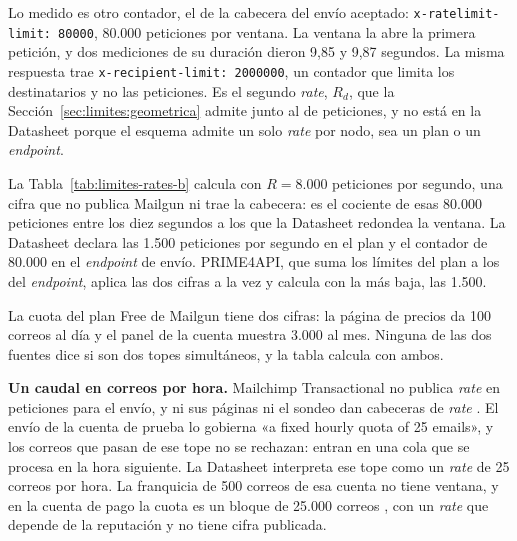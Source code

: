 Lo medido es otro contador, el de la cabecera del envío aceptado: \texttt{x-ratelimit-limit: 80000}, 80.000 peticiones por ventana.
La ventana la abre la primera petición, y dos mediciones de su duración dieron 9,85 y 9,87 segundos.
La misma respuesta trae \texttt{x-recipient-limit: 2000000}, un contador que limita los destinatarios y no las peticiones.
Es el segundo \textit{rate}, $R_d$, que la Sección~\ref{sec:limites:geometrica} admite junto al de peticiones, y no está en la Datasheet porque el esquema admite un solo \textit{rate} por nodo, sea un plan o un \textit{endpoint}.

La Tabla~\ref{tab:limites-rates-b} calcula con $R = 8.000$ peticiones por segundo, una cifra que no publica Mailgun ni trae la cabecera: es el cociente de esas 80.000 peticiones entre los diez segundos a los que la Datasheet redondea la ventana.
La Datasheet declara las 1.500 peticiones por segundo en el plan y el contador de 80.000 en el \textit{endpoint} de envío.
PRIME4API, que suma los límites del plan a los del \textit{endpoint}, aplica las dos cifras a la vez y calcula con la más baja, las 1.500.

La cuota del plan Free de Mailgun tiene dos cifras: la página de precios da 100 correos al día \citep{mailgunpricing} y el panel de la cuenta muestra 3.000 al mes.
Ninguna de las dos fuentes dice si son dos topes simultáneos, y la tabla calcula con ambos.

\textbf{Un caudal en correos por hora.}
Mailchimp Transactional no publica \textit{rate} en peticiones para el envío, y ni sus páginas ni el sondeo dan cabeceras de \textit{rate} \citep{mailchimpdocs}.
El envío de la cuenta de prueba lo gobierna «a fixed hourly quota of 25 emails», y los correos que pasan de ese tope no se rechazan: entran en una cola que se procesa en la hora siguiente.
La Datasheet interpreta ese tope como un \textit{rate} de 25 correos por hora.
La franquicia de 500 correos de esa cuenta no tiene ventana, y en la cuenta de pago la cuota es un bloque de 25.000 correos \citep{mailchimppricing}, con un \textit{rate} que depende de la reputación y no tiene cifra publicada.

